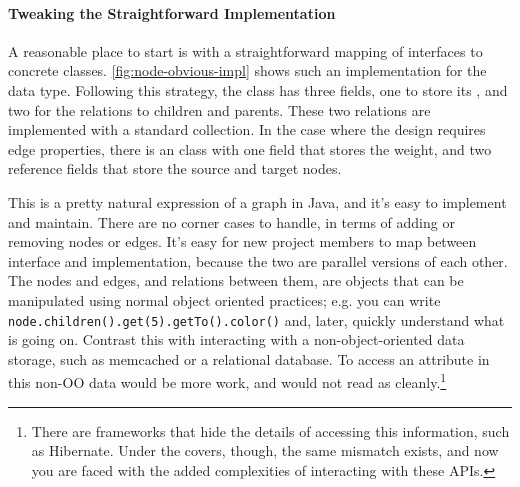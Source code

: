 
\paragraph{Tweaking the Straightforward Implementation}
A reasonable place to start is with a straightforward mapping of interfaces to
concrete classes.
\autoref{fig:node-obvious-impl} shows such an implementation for the
 data type.
Following this strategy, the  class has three fields, one to store
its , and two for the relations to children and parents. These two
relations are implemented with a standard  collection. In the
case where the design requires edge properties, there is an  class
with one field that stores the weight, and two reference fields that store the
source and target nodes.

This is a pretty natural expression of a graph in Java, and it's easy to
implement and maintain. There are no corner cases to handle, in terms of adding
or removing nodes or edges. It's easy for new project members to map between
interface and implementation, because the two are parallel versions of each
other. The nodes and edges, and relations between them, are objects that can be
manipulated using normal object oriented practices; e.g. you can write
\texttt{node.children().get(5).getTo()\-.color()} and, later, quickly
understand what is going on. Contrast this with interacting with a
non-object-oriented data storage, such as
memcached\cite{memcached} or a relational database. To access
an attribute in this non-OO data would be more work, and would not read as
cleanly.\footnote{There are frameworks that hide the details of accessing this
information, such as Hibernate\cite{hibernate}. Under the covers, though, the
same mismatch exists, and now you are faced with the added complexities of
interacting with these APIs.}

